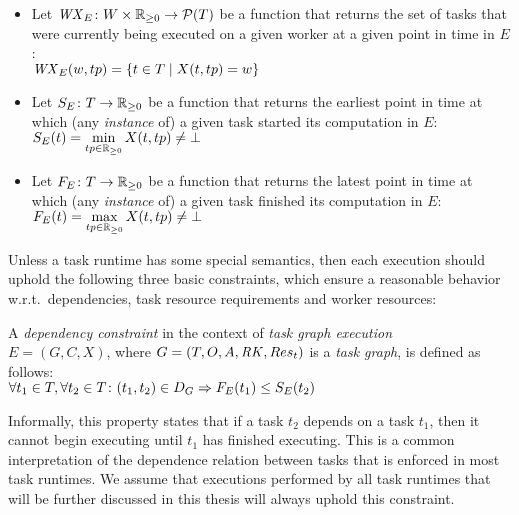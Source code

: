 \begin{itemize}[itemsep=0pt,topsep=2pt]
	\item Let
	$\mathit{WX}_E\colon W \times \mathbb{R}_{\geq{}0} \rightarrow \mathcal{P}(T)$ be a function
	that returns the set of tasks that were currently being
	executed on a given worker at a given point in time in $E$: \vspace{1mm}\\
	$\mathit{WX}_E(w, tp) = \{t \in{} T \mid X(t, tp) = w \}$
	\item Let $S_E\colon T \rightarrow \mathbb{R}_{\geq{}0}$ be a function that returns the
	earliest point in time at
	which (any \emph{instance} of) a given task started its computation in $E$: \vspace{1mm}\\
	$S_E(t) = \min\limits_{tp \in\mathbb{R}_{\geq{}0}} X(t, tp) \neq \bot$
	\item Let $F_E\colon T \rightarrow \mathbb{R}_{\geq{}0}$ be a function that
	returns the latest point in time at which (any \emph{instance} of) a given task finished its computation in $E$: \vspace{1mm}\\
	$F_E(t) = \max\limits_{tp \in\mathbb{R}_{\geq{}0}} X(t, tp) \neq \bot$
\end{itemize}

Unless a task runtime has some special semantics, then each execution
should uphold the following three basic constraints, which ensure a reasonable
behavior w.r.t.\ dependencies, task resource requirements and worker resources:

\vspace{2mm} A
\emph{dependency constraint} in the context of \emph{task graph execution} \\
$E = (G, C, X)$, where $G = (T, O, A, \mathit{RK}, Res_t)$ is a \emph{task graph}, is
defined as follows: \vspace{1mm}\\
$\forall t_1\in{}T, \forall t_2\in{}T\colon (t_1, t_2) \in D_G \Rightarrow F_E(t_1) \leq S_E(t_2)$

\vspace{1mm}Informally, this property states that if a task $t_2$ depends on a task $t_1$, then it
cannot begin executing until $t_1$ has finished executing. This is a common interpretation of
the dependence relation between tasks that is enforced in most task runtimes. We assume that
executions performed by all task runtimes that will be further discussed in this thesis will always
uphold this constraint.

